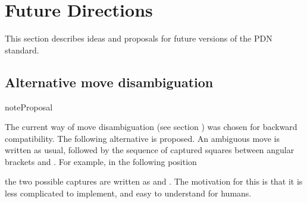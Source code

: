 \documentclass[letterpaper,10pt,english]{sphinxmanual}
\begin{document}
\begin{sphinxVerbatim}[commandchars=\\\{\}]
 
\end{sphinxVerbatim}

\sphinxstepscope


\chapter{Future Directions}
\label{\detokenize{future:future-directions}}\label{\detokenize{future::doc}}
\sphinxAtStartPar
This section describes ideas and proposals for future versions of the PDN standard.


\section{Alternative move disambiguation}
\label{\detokenize{future:alternative-move-disambiguation}}
\begin{sphinxadmonition}{note}{Proposal}

\sphinxAtStartPar
The current way of move disambiguation (see section {\hyperref[\detokenize{grammar:grammar-section}]{}}) was chosen for backward compatibility.
The following alternative is proposed. An ambiguous move is written as usual, followed by the sequence of
captured squares between angular brackets \sphinxcode{\sphinxupquote{\textless{}}} and \sphinxcode{\sphinxupquote{\textgreater{}}}. For example, in the following position

\noindent{}

\sphinxAtStartPar
the two possible captures are written as  and . The
motivation for this is that it is less complicated to implement, and easy to understand for humans.
\end{sphinxadmonition}
\end{document}
